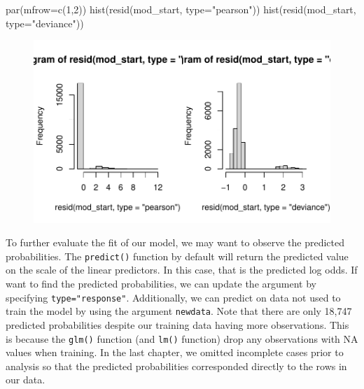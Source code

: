 \documentclass[
  letterpaper,
]{krantz}
\makeatletter
\newenvironment{Shaded}{\begin{snugshade}}{\end{snugshade}}
\newcommand{\AttributeTok}[1]{\textcolor[rgb]{0.40,0.45,0.13}{#1}}
\newcommand{\DecValTok}[1]{\textcolor[rgb]{0.68,0.00,0.00}{#1}}
\newcommand{\FunctionTok}[1]{\textcolor[rgb]{0.28,0.35,0.67}{#1}}
\newcommand{\NormalTok}[1]{\textcolor[rgb]{0.00,0.23,0.31}{#1}}
\newcommand{\StringTok}[1]{\textcolor[rgb]{0.13,0.47,0.30}{#1}}
\newenvironment{kframe}{%
\medskip{}
\setlength{\fboxsep}{.8em}
 \def\at@end@of@kframe{}%
 \ifinner\ifhmode%
  \def\at@end@of@kframe{\end{minipage}}%
  \begin{minipage}{\columnwidth}%
 \fi\fi%
 \def\FrameCommand##1{\hskip\@totalleftmargin \hskip-\fboxsep
 \colorbox{shadecolor}{##1}\hskip-\fboxsep
     \hskip-\linewidth \hskip-\@totalleftmargin \hskip\columnwidth}%
 \MakeFramed {\advance\hsize-\width
   \@totalleftmargin\z@ \linewidth\hsize
   \@setminipage}}%
 {\par\unskip\endMakeFramed%
 \at@end@of@kframe}
\renewenvironment{Shaded}{\begin{kframe}}{\end{kframe}}
\makeatother
\begin{document}
\begin{Shaded}
\begin{Highlighting}[]
\FunctionTok{par}\NormalTok{(}\AttributeTok{mfrow=}\FunctionTok{c}\NormalTok{(}\DecValTok{1}\NormalTok{,}\DecValTok{2}\NormalTok{))}
\FunctionTok{hist}\NormalTok{(}\FunctionTok{resid}\NormalTok{(mod\_start, }\AttributeTok{type=}\StringTok{"pearson"}\NormalTok{))}
\FunctionTok{hist}\NormalTok{(}\FunctionTok{resid}\NormalTok{(mod\_start, }\AttributeTok{type=}\StringTok{"deviance"}\NormalTok{))}
\end{Highlighting}
\end{Shaded}

\begin{figure}[H]

{\centering \includegraphics[width=1\textwidth,height=\textheight]{book/11_logistic_regression_files/figure-pdf/unnamed-chunk-7-1.pdf}

}

\end{figure}

To further evaluate the fit of our model, we may want to observe the
predicted probabilities. The \texttt{predict()} function by default will
return the predicted value on the scale of the linear predictors. In
this case, that is the predicted log odds. If want to find the predicted
probabilities, we can update the argument by specifying
\texttt{type="response"}. Additionally, we can predict on data not used
to train the model by using the argument \texttt{newdata}. Note that
there are only 18,747 predicted probabilities despite our training data
having more observations. This is because the \texttt{glm()} function
(and \texttt{lm()} function) drop any observations with NA values when
training. In the last chapter, we omitted incomplete cases prior to
analysis so that the predicted probabilities corresponded directly to
the rows in our data.
\end{document}
